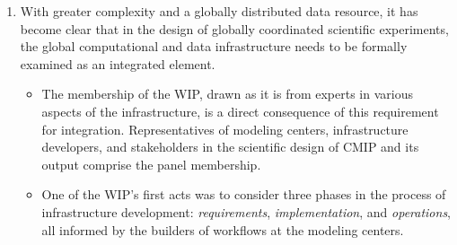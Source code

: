 \documentclass[gmd,manuscript]{copernicus}
\begin{document}
\begin{enumerate}
\item With greater complexity and a globally distributed data
  resource, it has become clear that in the design of globally
  coordinated scientific experiments, the global computational and
  data infrastructure needs to be formally examined as an integrated
  element.
  \begin{itemize}
  \item The membership of the WIP, drawn as it is from experts in
    various aspects of the infrastructure, is a direct consequence of
    this requirement for integration. Representatives of modeling
    centers, infrastructure developers, and stakeholders in the
    scientific design of CMIP and its output comprise the panel
    membership.
  \item One of the WIP's first acts was to consider three phases in
    the process of infrastructure development: \emph{requirements},
    \emph{implementation}, and \emph{operations}, all informed by the
    builders of workflows at the modeling centers.
    

\end{itemize}
\end{enumerate}
\end{document}
